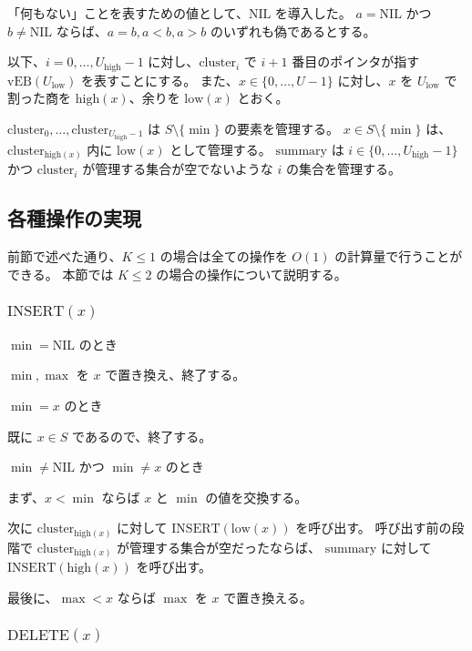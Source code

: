 \documentclass[dvipdfmx,a4j,10pt]{jarticle}
\begin{document}
「何もない」ことを表すための値として、$\mathrm{NIL}$ を導入した。
$a = \mathrm{NIL}$ かつ $b \neq \mathrm{NIL}$ ならば、$a = b, a < b, a > b$ のいずれも偽であるとする。

以下、$i = 0, \dots, U_{\mathrm{high}} - 1$ に対し、$\mathrm{cluster}_i$ で $i + 1$ 番目のポインタが指す $\mathrm{vEB}(U_{\mathrm{low}})$ を表すことにする。
また、$x \in \{0, \dots, U - 1\}$ に対し、$x$ を $U_{\mathrm{low}}$ で割った商を $\mathrm{high}(x)$、余りを $\mathrm{low}(x)$ とおく。

$\mathrm{cluster}_0, \dots, \mathrm{cluster}_{U_{\mathrm{high}} - 1}$ は $S \setminus \{\min\}$ の要素を管理する。
$x \in S \setminus \{\min\}$ は、$\mathrm{cluster}_{\mathrm{high}(x)}$ 内に $\mathrm{low}(x)$ として管理する。
$\mathrm{summary}$ は $i \in \{0, \dots, U_{\mathrm{high}} - 1\}$ かつ $\mathrm{cluster}_i$ が管理する集合が空でないような $i$ の集合を管理する。

\subsection{各種操作の実現}

前節で述べた通り、$K \leq 1$ の場合は全ての操作を $O(1)$ の計算量で行うことができる。
本節では $K \leq 2$ の場合の操作について説明する。

\subsubsection{$\mathrm{INSERT}(x)$}

\noindent [1] $\min = \mathrm{NIL}$ のとき

$\min, \max$ を $x$ で置き換え、終了する。

\noindent [2] $\min = x$ のとき

既に $x \in S$ であるので、終了する。

\noindent [3] $\min \neq \mathrm{NIL}$ かつ $\min \neq x$ のとき

まず、$x < \min$ ならば $x$ と $\min$ の値を交換する。

次に $\mathrm{cluster}_{\mathrm{high}(x)}$ に対して $\mathrm{INSERT}(\mathrm{low}(x))$ を呼び出す。
呼び出す前の段階で $\mathrm{cluster}_{\mathrm{high}(x)}$ が管理する集合が空だったならば、
$\mathrm{summary}$ に対して $\mathrm{INSERT}(\mathrm{high}(x))$ を呼び出す。

最後に、$\max < x$ ならば $\max$ を $x$ で置き換える。

\subsubsection{$\mathrm{DELETE}(x)$}
\end{document}
